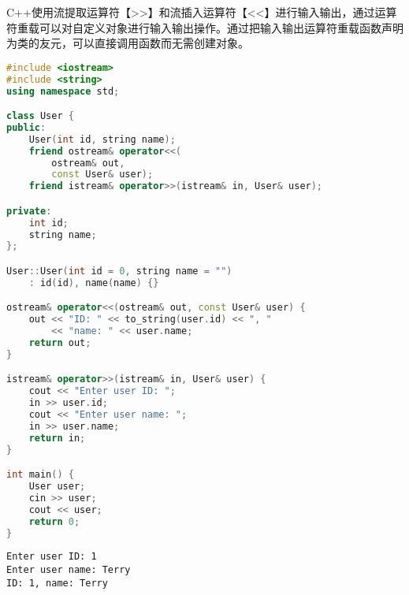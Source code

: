 C++使用流提取运算符【>>】和流插入运算符【<<】进行输入输出，通过运算符重载可以对自定义对象进行输入输出操作。通过把输入输出运算符重载函数声明为类的友元，可以直接调用函数而无需创建对象。 \\


\begin{lstlisting}[language=C++]
#include <iostream>
#include <string>
using namespace std;

class User {
public:
    User(int id, string name);
    friend ostream& operator<<(
        ostream& out,
        const User& user);
    friend istream& operator>>(istream& in, User& user);

private:
    int id;
    string name;
};

User::User(int id = 0, string name = "")
    : id(id), name(name) {}

ostream& operator<<(ostream& out, const User& user) {
    out << "ID: " << to_string(user.id) << ", "
        << "name: " << user.name;
    return out;
}

istream& operator>>(istream& in, User& user) {
    cout << "Enter user ID: ";
    in >> user.id;
    cout << "Enter user name: ";
    in >> user.name;
    return in;
}

int main() {
    User user;
    cin >> user;
    cout << user;
    return 0;
}
\end{lstlisting}

\begin{tcolorbox}
	\begin{verbatim}
Enter user ID: 1
Enter user name: Terry
ID: 1, name: Terry
	\end{verbatim}
\end{tcolorbox}

\newpage